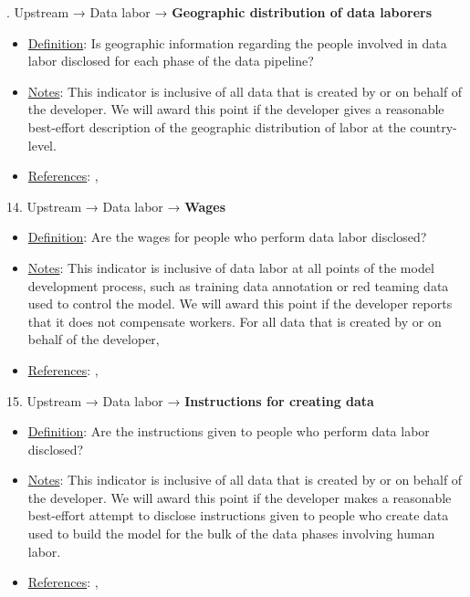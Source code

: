 . Upstream → Data labor → \textbf{Geographic distribution of data laborers}
\vspace{-\parskip}
\begin{itemize}
	\item
	\underline{Definition}: Is geographic information regarding the people involved in data labor disclosed for each phase of the data pipeline?
	\item
	\underline{Notes}: This indicator is inclusive of all data that is created by or on behalf of the developer. We will award this point if the developer gives a reasonable best-effort description of the geographic distribution of labor at the country-level.
	\item
	\underline{References}: \citet{hao2023cleaning}, \citet{gray2019ghost}
\end{itemize} \vspace{\baselineskip}


14. Upstream → Data labor → \textbf{Wages}
\vspace{-\parskip}
\begin{itemize}
	\item
	\underline{Definition}: Are the wages for people who perform data labor disclosed?
	\item
	\underline{Notes}: This indicator is inclusive of data labor at all points of the model development process, such as training data annotation or red teaming data used to control the model. We will award this point if the developer reports that it does not compensate workers. For all data that is created by or on behalf of the developer, 
	\item
	\underline{References}: \citet{kittur2013future}, \citet{dzieza2023ai}
\end{itemize} \vspace{\baselineskip}


15. Upstream → Data labor → \textbf{Instructions for creating data}
\vspace{-\parskip}
\begin{itemize}
	\item
	\underline{Definition}: Are the instructions given to people who perform data labor disclosed?
	\item
	\underline{Notes}: This indicator is inclusive of all data that is created by or on behalf of the developer. We will award this point if the developer makes a reasonable best-effort attempt to disclose instructions given to people who create data used to build the model for the bulk of the data phases involving human labor.
	\item
	\underline{References}: \citet{sambasivan2021everyone}, \citet{kittur2013future}
\end{itemize} \vspace{\baselineskip}


